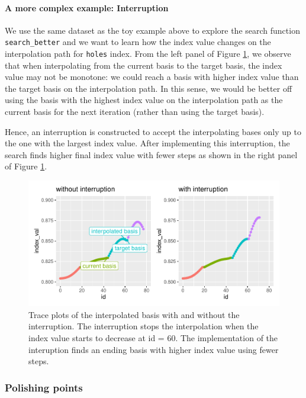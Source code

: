 \documentclass[12pt]{article}
\begin{document}
\hypertarget{a-more-complex-example-interruption}{%
\paragraph{A more complex example:
Interruption}\label{a-more-complex-example-interruption}}

We use the same dataset as the toy example above to explore the search
function \texttt{search\_better} and we want to learn how the index
value changes on the interpolation path for \texttt{holes} index. From
the left panel of Figure \ref{interruption}, we observe that when
interpolating from the current basis to the target basis, the index
value may not be monotone: we could reach a basis with higher index
value than the target basis on the interpolation path. In this sense, we
would be better off using the basis with the highest index value on the
interpolation path as the current basis for the next iteration (rather
than using the target basis).

Hence, an interruption is constructed to accept the interpolating bases
only up to the one with the largest index value. After implementing this
interruption, the search finds higher final index value with fewer steps
as shown in the right panel of Figure \ref{interruption}.

\begin{figure}
\centering
\includegraphics{paper_files/figure-latex/interruption-1.pdf}
\caption{\label{interruption}Trace plots of the interpolated basis with
and without the interruption. The interruption stops the interpolation
when the index value starts to decrease at id = 60. The implementation
of the interuption finds an ending basis with higher index value using
fewer steps.}
\end{figure}

\hypertarget{polishing-points}{%
\subsubsection{Polishing points}\label{polishing-points}}
\end{document}
